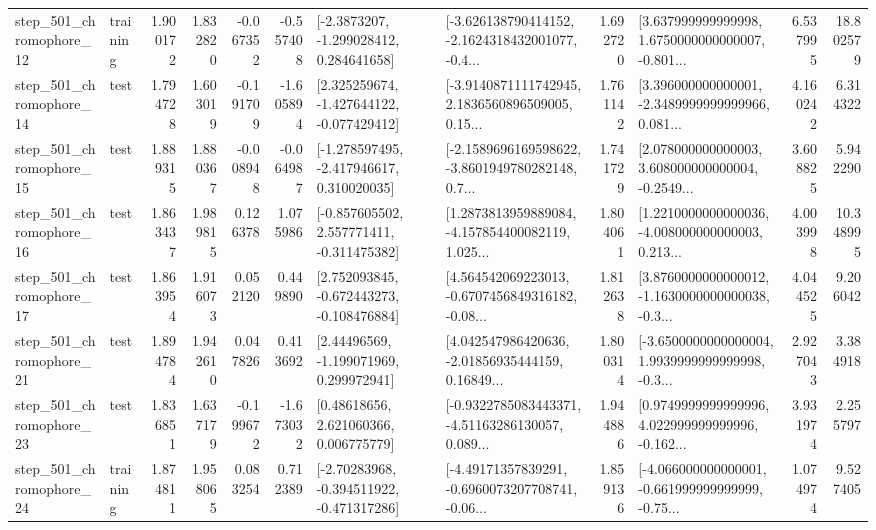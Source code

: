 \begin{tabular}{llrrrrllrlrr}
  step\_501\_chromophore\_12 &  training &      1.900172 &    1.832820 &     -0.067352 & -0.557408 &     [-2.3873207, -1.299028412, 0.284641658] &  [-3.626138790414152, -2.1624318432001077, -0.4... &       1.692720 &  [3.637999999999998, 1.6750000000000007, -0.801... &            6.537995 &         18.802579 \\
  step\_501\_chromophore\_14 &      test &      1.794728 &    1.603019 &     -0.191709 & -1.605894 &   [2.325259674, -1.427644122, -0.077429412] &  [-3.9140871111742945, 2.1836560896509005, 0.15... &       1.761142 &  [3.396000000000001, -2.3489999999999966, 0.081... &            4.160242 &          6.314322 \\
  step\_501\_chromophore\_15 &      test &      1.889315 &    1.880367 &     -0.008948 & -0.064987 &   [-1.278597495, -2.417946617, 0.310020035] &  [-2.1589696169598622, -3.8601949780282148, 0.7... &       1.741729 &  [2.078000000000003, 3.608000000000004, -0.2549... &            3.608825 &          5.942290 \\
  step\_501\_chromophore\_16 &      test &      1.863437 &    1.989815 &      0.126378 &  1.075986 &   [-0.857605502, 2.557771411, -0.311475382] &  [1.2873813959889084, -4.157854400082119, 1.025... &       1.804061 &  [1.2210000000000036, -4.008000000000003, 0.213... &            4.003998 &         10.348995 \\
  step\_501\_chromophore\_17 &      test &      1.863954 &    1.916073 &      0.052120 &  0.449890 &   [2.752093845, -0.672443273, -0.108476884] &  [4.564542069223013, -0.6707456849316182, -0.08... &       1.812638 &  [3.8760000000000012, -1.1630000000000038, -0.3... &            4.044525 &          9.206042 \\
  step\_501\_chromophore\_21 &      test &      1.894784 &    1.942610 &      0.047826 &  0.413692 &     [2.44496569, -1.199071969, 0.299972941] &  [4.042547986420636, -2.01856935444159, 0.16849... &       1.800314 &  [-3.6500000000000004, 1.9939999999999998, -0.3... &            2.927043 &          3.384918 \\
  step\_501\_chromophore\_23 &      test &      1.836851 &    1.637179 &     -0.199672 & -1.673032 &      [0.48618656, 2.621060366, 0.006775779] &  [-0.9322785083443371, -4.51163286130057, 0.089... &       1.944886 &  [0.9749999999999996, 4.022999999999996, -0.162... &            3.931974 &          2.255797 \\
  step\_501\_chromophore\_24 &  training &      1.874811 &    1.958065 &      0.083254 &  0.712389 &   [-2.70283968, -0.394511922, -0.471317286] &  [-4.49171357839291, -0.6960073207708741, -0.06... &       1.859136 &  [-4.066000000000001, -0.661999999999999, -0.75... &            1.074974 &          9.527405 \\

\end{tabular}
